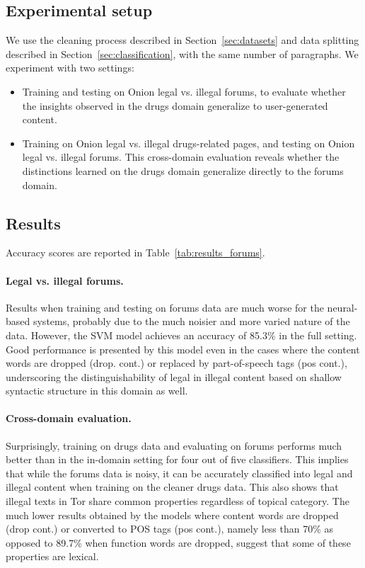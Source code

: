 \documentclass[11pt,a4paper,table]{article}
\begin{document}
\subsection{Experimental setup}
We use the cleaning process described in Section~\ref{sec:datasets} and data splitting described in Section~\ref{sec:classification}, with the same number of paragraphs.
We experiment with two settings:
\begin{itemize}
\item Training and testing on Onion legal vs. illegal forums,
to evaluate whether the insights observed in the drugs domain generalize to user-generated content.
\item Training on Onion legal vs. illegal drugs-related pages,
and testing on Onion legal vs. illegal forums.
This cross-domain evaluation reveals whether the distinctions learned on the
drugs domain generalize directly to the forums domain.
\end{itemize}  

\subsection{Results}

Accuracy scores are reported in Table~\ref{tab:results_forums}.

\paragraph{Legal vs. illegal forums.}

Results when training and testing on forums data are much worse for the neural-based systems,
probably due to the much noisier and more varied nature of the data. 
However, the SVM model achieves an accuracy of 85.3\% in the full setting. 
Good performance is presented by this model even in the cases where the content words are dropped (drop. cont.) 
or replaced by part-of-speech tags (pos cont.),
underscoring the distinguishability of legal in illegal content based on shallow syntactic structure in this domain as well.

\paragraph{Cross-domain evaluation.}

Surprisingly, training on drugs data and evaluating on forums performs much
better than %
in the in-domain setting
for four out of five classifiers.
This implies that while the forums data is noisy, it can be accurately classified into legal and illegal content
when training on the cleaner drugs data. This also shows that illegal texts in Tor share common properties regardless of topical category.
The much lower results obtained by the models where content words are dropped (drop cont.) or converted to POS tags (pos cont.),
namely less than 70\% as opposed to 89.7\% when function words are dropped, suggest that some of these properties are lexical.
\end{document}
